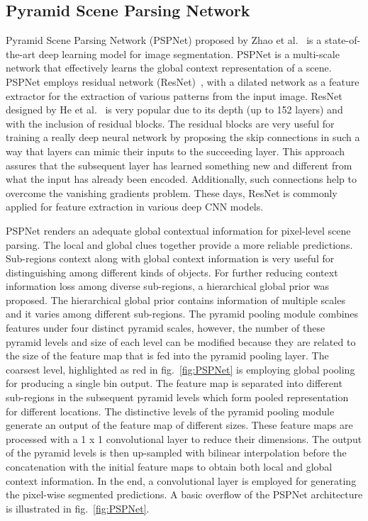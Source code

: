 \subsection{Pyramid Scene Parsing Network}
	Pyramid Scene Parsing Network (PSPNet) proposed by Zhao et al.~\cite{zhao2017pyramid} is a state-of-the-art deep learning model for image segmentation. PSPNet is a multi-scale network that effectively learns the global context representation of a scene. PSPNet employs residual network (ResNet)~\cite{he2016deep}, with a dilated network as a feature extractor for the extraction of various patterns from the input image. ResNet designed by He et al.~\cite{he2016deep} is very popular due to its depth (up to 152 layers) and with the inclusion of residual blocks. The residual blocks are very useful for training a really deep neural network by proposing the skip connections in such a way that layers can mimic their inputs to the succeeding layer. 
	This approach assures that the subsequent layer has learned something new and different from what the input has already been encoded. Additionally, such connections help to overcome the vanishing gradients problem. These days, ResNet is commonly applied for feature extraction in various deep CNN models. 
	
	PSPNet renders an adequate global contextual information for pixel-level scene parsing. The local and global clues together provide a more reliable predictions. Sub-regions context along with global context information is very useful for distinguishing among different kinds of objects. For further reducing context information loss among diverse sub-regions, a hierarchical global prior was proposed. The hierarchical global prior contains information of multiple scales and it varies among different sub-regions. The pyramid pooling module combines features under four distinct pyramid scales, however, the number of these pyramid levels and size of each level can be modified because they are related to the size of the feature map that is fed into the pyramid pooling layer. The coarsest level, highlighted as red in fig.~\ref{fig:PSPNet} is employing global pooling for producing a single bin output. The feature map is separated into different sub-regions in the subsequent pyramid levels which form pooled representation for different locations. The distinctive levels of the pyramid pooling module generate an output of the feature map of different sizes. These feature maps are processed with a 1 x 1 convolutional layer to reduce their dimensions. The output of the pyramid levels is then up-sampled with bilinear interpolation before the concatenation with the initial feature maps to obtain both local and global context information. In the end, a convolutional layer is employed for generating the pixel-wise segmented predictions. A basic overflow of the PSPNet architecture is illustrated in fig.~\ref{fig:PSPNet}. 
	
